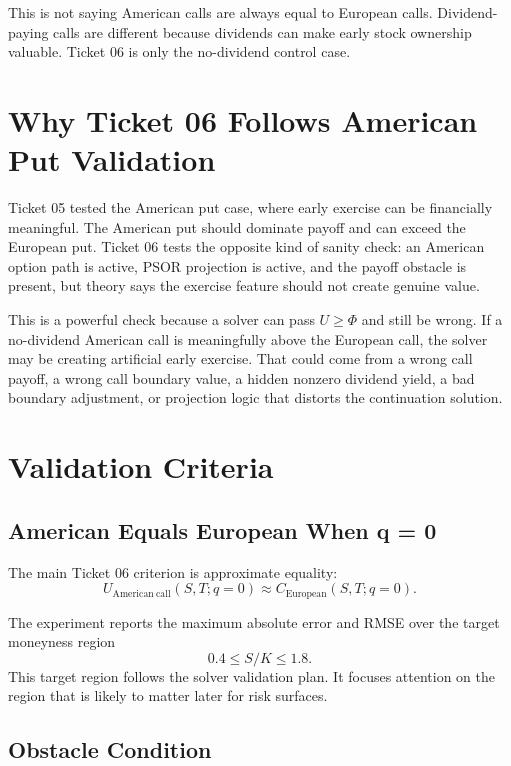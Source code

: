 \documentclass[11pt,a4paper]{article}
\begin{document}
This is not saying American calls are always equal to European calls. Dividend-paying calls are
different because dividends can make early stock ownership valuable. Ticket 06 is only the
no-dividend control case.

\section{Why Ticket 06 Follows American Put Validation}

Ticket 05 tested the American put case, where early exercise can be financially meaningful. The
American put should dominate payoff and can exceed the European put. Ticket 06 tests the opposite
kind of sanity check: an American option path is active, PSOR projection is active, and the payoff
obstacle is present, but theory says the exercise feature should not create genuine value.

This is a powerful check because a solver can pass \(U \geq \Phi\) and still be wrong. If a
no-dividend American call is meaningfully above the European call, the solver may be creating
artificial early exercise. That could come from a wrong call payoff, a wrong call boundary value,
a hidden nonzero dividend yield, a bad boundary adjustment, or projection logic that distorts the
continuation solution.

\section{Validation Criteria}

\subsection{American Equals European When q = 0}

The main Ticket 06 criterion is approximate equality:
\begin{equation}
  U_{\mathrm{American\ call}}(S,T; q=0)
  \approx C_{\mathrm{European}}(S,T; q=0).
\end{equation}

The experiment reports the maximum absolute error and RMSE over the target moneyness region
\[
  0.4 \leq S/K \leq 1.8.
\]
This target region follows the solver validation plan. It focuses attention on the region that is
likely to matter later for risk surfaces.

\subsection{Obstacle Condition}
\end{document}
